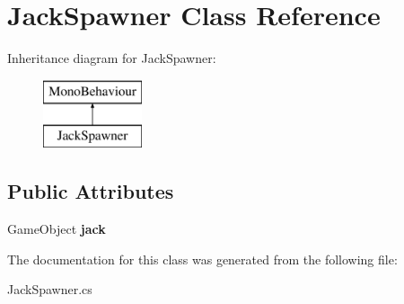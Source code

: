 \hypertarget{class_jack_spawner}{}\section{Jack\+Spawner Class Reference}
\label{class_jack_spawner}
Inheritance diagram for Jack\+Spawner\+:\begin{figure}[H]
\begin{center}
\leavevmode
\includegraphics[height=2.000000cm]{class_jack_spawner}
\end{center}
\end{figure}
\subsection*{Public Attributes}
\begin{DoxyCompactItemize}
\item 
\mbox{\label{class_jack_spawner_a420c4754b81618c823f9dfbeb5b1d0e9}} 
Game\+Object {\bfseries jack}
\end{DoxyCompactItemize}


The documentation for this class was generated from the following file\+:\begin{DoxyCompactItemize}
\item 
Jack\+Spawner.\+cs\end{DoxyCompactItemize}
